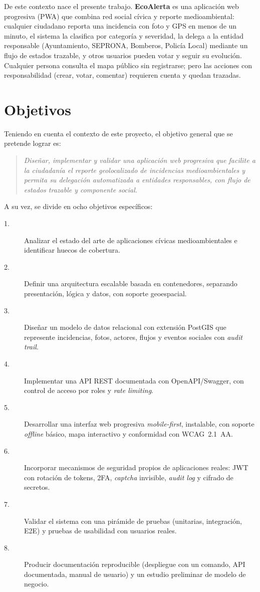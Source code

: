 De este contexto nace el presente trabajo. \textbf{EcoAlerta} es una aplicación web progresiva (PWA) que combina red social cívica y reporte medioambiental: cualquier ciudadano reporta una incidencia con foto y GPS en menos de un minuto, el sistema la clasifica por categoría y severidad, la delega a la entidad responsable (Ayuntamiento, SEPRONA, Bomberos, Policía Local) mediante un flujo de estados trazable, y otros usuarios pueden votar y seguir su evolución. Cualquier persona consulta el mapa público sin registrarse; pero las acciones con responsabilidad (crear, votar, comentar) requieren cuenta y quedan trazadas.


\section{Objetivos}
\label{sec:objetivos}

Teniendo en cuenta el contexto de este proyecto, el objetivo general que se pretende lograr es:

\begin{quote}
\textit{Diseñar, implementar y validar una aplicación web progresiva que facilite a la ciudadanía el reporte geolocalizado de incidencias medioambientales y permita su delegación automatizada a entidades responsables, con flujo de estados trazable y componente social.}
\end{quote}

A su vez, se divide en ocho objetivos específicos:

\begin{description}
  \item[1.] Analizar el estado del arte de aplicaciones cívicas medioambientales e identificar huecos de cobertura.
  \item[2.] Definir una arquitectura escalable basada en contenedores, separando presentación, lógica y datos, con soporte geoespacial.
  \item[3.] Diseñar un modelo de datos relacional con extensión PostGIS que represente incidencias, fotos, actores, flujos y eventos sociales con \textit{audit trail}.
  \item[4.] Implementar una API REST documentada con OpenAPI/Swagger, con control de acceso por roles y \textit{rate limiting}.
  \item[5.] Desarrollar una interfaz web progresiva \textit{mobile-first}, instalable, con soporte \textit{offline} básico, mapa interactivo y conformidad con WCAG~2.1~AA.
  \item[6.] Incorporar mecanismos de seguridad propios de aplicaciones reales: JWT con rotación de tokens, 2FA, \textit{captcha} invisible, \textit{audit log} y cifrado de secretos.
  \item[7.] Validar el sistema con una pirámide de pruebas (unitarias, integración, E2E) y pruebas de usabilidad con usuarios reales.
  \item[8.] Producir documentación reproducible (despliegue con un comando, API documentada, manual de usuario) y un estudio preliminar de modelo de negocio.
\end{description}


